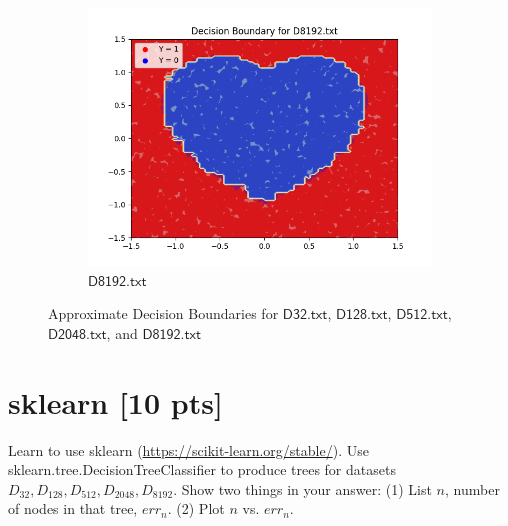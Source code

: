 \documentclass[a4paper]{article}
\theoremstyle{definition}
\newenvironment{soln}{
    \leavevmode\color{blue}\ignorespaces
}{}
\begin{document}
\begin{enumerate}
\begin{soln}
\begin{figure}[H]
\begin{subfigure}{0.5\textwidth}
          \includegraphics[width=1.1\linewidth]{Decision_Boundary_D8192.png}
          \caption{$\mathsf{D8192.txt}$}
          \label{fig:7sub5}
          \end{subfigure}%
          \caption{Approximate Decision Boundaries for $\mathsf{D32.txt}$, $\mathsf{D128.txt}$, $\mathsf{D512.txt}$, $\mathsf{D2048.txt}$, and $\mathsf{D8192.txt}$}
          \label{fig:7}
      \end{figure}
  \end{soln}
  
\end{enumerate}

\section{sklearn [10 pts]}
Learn to use sklearn (\url{https://scikit-learn.org/stable/}).
Use sklearn.tree.DecisionTreeClassifier to produce trees for datasets $D_{32}, D_{128}, D_{512}, D_{2048}, D_{8192}$.  Show two things in your answer: (1) List $n$, number of nodes in that tree, $err_n$. (2) Plot $n$ vs. $err_n$.
\end{document}
